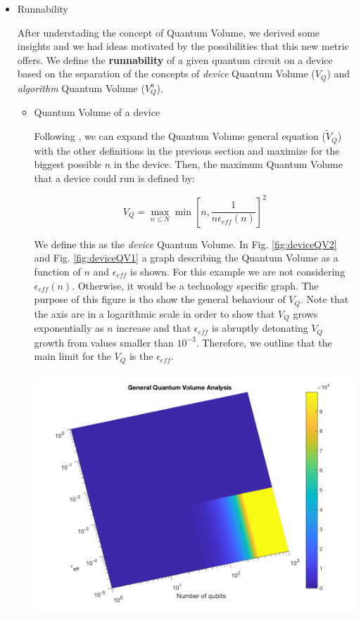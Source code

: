 \begin{itemize}
\begin{itemize}
\item Runnability
\label{sec:org328d464}

After understading the concept of Quantum Volume, we derived some insights and we had ideas motivated by the possibilities that this new metric offers. 
We define the \textbf{runnability} of a given quantum circuit on a device based on the separation of the concepts of \emph{device} Quantum Volume (\(V_Q\)) and \emph{algorithm} Quantum Volume (\(V^a_Q\)).


\begin{itemize}
\item Quantum Volume of a device
\label{sec:org48c5a3f}

Following \cite{Bishop_2017,Moll_2018}, we can expand the Quantum Volume general equation (\(\tilde{V}_Q\)) with the other definitions in the previous section and maximize for the biggest possible \(n\) in the device. 
Then, the maximum Quantum Volume that a device could run is defined by:

$$V_Q = \max_{n \le N} \min \left[ n,\frac{1}{n \epsilon_{eff} (n)}\right]^2$$

We define this as the \emph{device} Quantum Volume. 
In Fig. \ref{fig:deviceQV2} and Fig. \ref{fig:deviceQV1} a graph describing the Quantum Volume as a function of \(n\) and \(\epsilon_{eff}\) is shown.
For this example we are not considering \(\epsilon_{eff} (n)\).
Otherwise, it would be a technology specific graph.
The purpose of this figure is tho show the general behaviour of \(V_Q\).
Note that the axis are in a logarithmic scale in order to show that \(V_Q\) grows exponentially as \(n\) increase and that \(\epsilon_{eff}\) is abruptly detonating \(V_Q\) growth from values smaller than \(10^{-3}\).
Therefore, we outline that the main limit for the \(V_Q\) is the \(\epsilon_{eff}\).


\begin{minipage}{.45\textwidth}

\centering

\begin{center}
\includegraphics[width=.9\linewidth]{figures/general_QV2.png}
\end{center}


\end{minipage}
\end{itemize}
\end{itemize}
\end{itemize}
